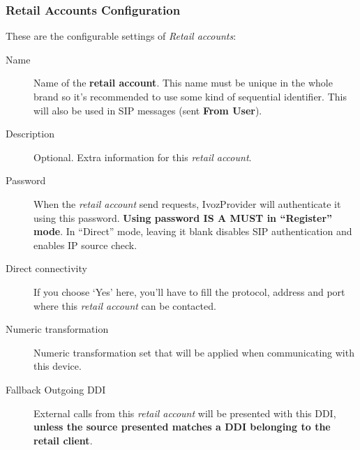 \documentclass[letterpaper,10pt,spanish]{sphinxmanual}
\begin{document}
\subsubsection{Retail Accounts Configuration}
\label{administration_portal/client/retail/retail_accounts:retail-accounts-configuration}
These are the configurable settings of \emph{Retail accounts}:
\begin{description}
\item[{Name}] \leavevmode{}\label{administration_portal/client/retail/retail_accounts:term-name}
Name of the \textbf{retail account}. This name must be unique in the whole brand so
it's recommended to use some kind of sequential identifier. This will also be used
in SIP messages (sent \textbf{From User}).

\item[{Description}] \leavevmode{}\label{administration_portal/client/retail/retail_accounts:term-description}
Optional. Extra information for this \emph{retail account}.

\item[{Password}] \leavevmode{}\label{administration_portal/client/retail/retail_accounts:term-password}
When the \emph{retail account} send requests, IvozProvider will authenticate it using
this password. \textbf{Using password IS A MUST in ``Register'' mode}. In ``Direct'' mode,
leaving it blank disables SIP authentication and enables IP source check.

\item[{Direct connectivity}] \leavevmode{}\label{administration_portal/client/retail/retail_accounts:term-direct-connectivity}
If you choose `Yes' here, you'll have to fill the protocol, address and
port where this \emph{retail account} can be contacted.

\item[{Numeric transformation}] \leavevmode{}\label{administration_portal/client/retail/retail_accounts:term-numeric-transformation}
Numeric transformation set that will be applied when communicating with this device.

\item[{Fallback Outgoing DDI}] \leavevmode{}\label{administration_portal/client/retail/retail_accounts:term-fallback-outgoing-ddi}
External calls from this \emph{retail account} will be presented with this DDI, \textbf{unless
the source presented matches a DDI belonging to the retail client}.


\end{description}
\end{document}
